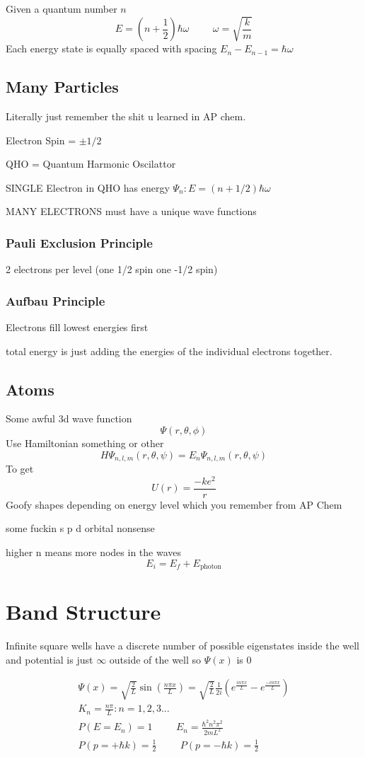 \documentclass[fleqn]{report}
\newcommand{\hp}{\hspace{1cm}}
\newcommand{\equations}[1]{
\begin{gather*}
#1
\end{gather*}
}
\begin{document}
Given a quantum number $n$
\[
E = \left( n + \frac{1}{2} \right) \hbar \omega
\hp
\omega = \sqrt{ \frac{k}{m}}
\]
Each energy state is equally spaced with spacing $E_n - E_{n-1} = \hbar \omega$

\section{Many Particles}
Literally just remember the shit u learned in AP chem.

Electron Spin = $\pm 1/2$

QHO = Quantum Harmonic Oscilattor

SINGLE Electron in QHO has energy $\Psi_n : E = (n + 1/2) \hbar \omega$

MANY ELECTRONS must have a unique wave functions

\subsection{Pauli Exclusion Principle}
2 electrons per level (one 1/2 spin one -1/2 spin)

\subsection{Aufbau Principle}
Electrons fill lowest energies first

total energy is just adding the energies of the individual electrons together.

\section{Atoms}
Some awful 3d wave function
\[
\Psi (r, \theta, \phi)
\]
Use Hamiltonian something or other
\[
H \Psi_{n, l, m} (r, \theta, \psi) = E_n \Psi_{n, l, m} (r, \theta, \psi)
\]
To get
\[
U(r) = \frac{-ke^2}{r}
\]
Goofy shapes depending on energy level which you remember from AP Chem

some fuckin s p d orbital nonsense

higher n means more nodes in the waves
\[
E_i = E_f + E_{\textrm{photon}}
\]


\chapter{Band Structure}
Infinite square wells have a discrete number of possible eigenstates inside the well and potential is just $\infty$ outside of the well so $\Psi (x)$ is 0
\equations{
\Psi(x) = \sqrt{\frac{2}{L}} \sin \left( \frac{n \pi x}{L} \right)
=
 \sqrt{\frac{2}{L}} \frac{1}{2i} \left(  e^{\frac{i n \pi x}{L}} - e^{\frac{-i n \pi x}{L}} \right)
\\
K_n = \frac{n \pi}{L}: n = 1, 2, 3 \ldots
\\
P(E = E_n) = 1
\hp
E_n = \frac{\hbar^2 n^2 \pi^2}{2m L^2}
\\
P(p = + \hbar k) = \frac{1}{2}
\hp
P(p = - \hbar k) = \frac{1}{2}
}
\end{document}
